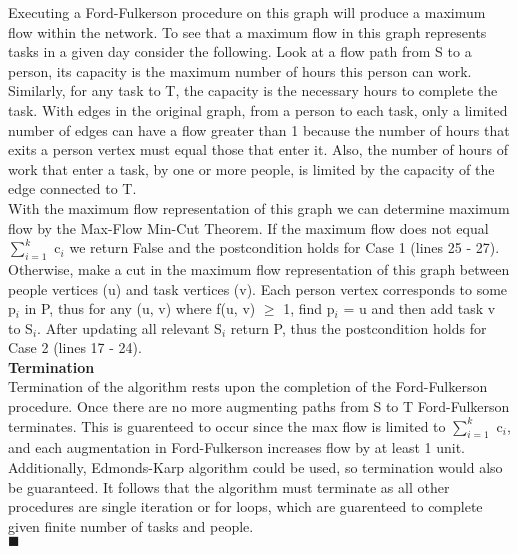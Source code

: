 \documentclass[10pt]{csc_assignment}
\begin{document}
\begin{description}
Executing a Ford-Fulkerson procedure on this graph will produce a maximum flow within the network. To see that a maximum flow in this graph represents tasks in a given day consider the following. Look at a flow path from S to a person, its capacity is the maximum number of hours this person can work. Similarly, for any task to T, the capacity is the necessary hours to complete the task. With edges in the original graph, from a person to each task, only a limited number of edges can have a flow greater than 1 because the number of hours that exits a person vertex must equal those that enter it. Also, the number of hours of work that enter a task, by one or more people, is limited by the capacity of the edge connected to T. \\
With the maximum flow representation of this graph we can determine maximum flow by the Max-Flow Min-Cut Theorem. If the maximum flow does not equal $\sum_{i = 1}^{k}$ c$_{i}$ we return False and the postcondition holds for Case 1 (lines 25 - 27). Otherwise, make a cut in the maximum flow representation of this graph between people vertices (u) and task vertices (v). Each person vertex corresponds to some p$_{i}$ in P, thus for any (u, v) where f(u, v) $\geqslant$ 1, find p$_{i}$ = u and then add task v to S$_{i}$. After updating all relevant S$_{i}$ return P, thus the postcondition holds for Case 2 (lines 17 - 24).\\
\textbf{Termination}\\
Termination of the algorithm rests upon the completion of the Ford-Fulkerson procedure. Once there are no more augmenting paths from S to T  Ford-Fulkerson terminates. This is guarenteed to occur since the max flow is limited to $\sum_{i = 1}^{k}$ c$_{i}$, and each augmentation in Ford-Fulkerson increases flow by at least 1 unit. Additionally, Edmonds-Karp algorithm could be used, so termination would also be guaranteed. It follows that the algorithm must terminate as all other procedures are single iteration or for loops, which are guarenteed to complete given finite number of tasks and people.\\
$\blacksquare$\\    



\end{description}
\end{document}
